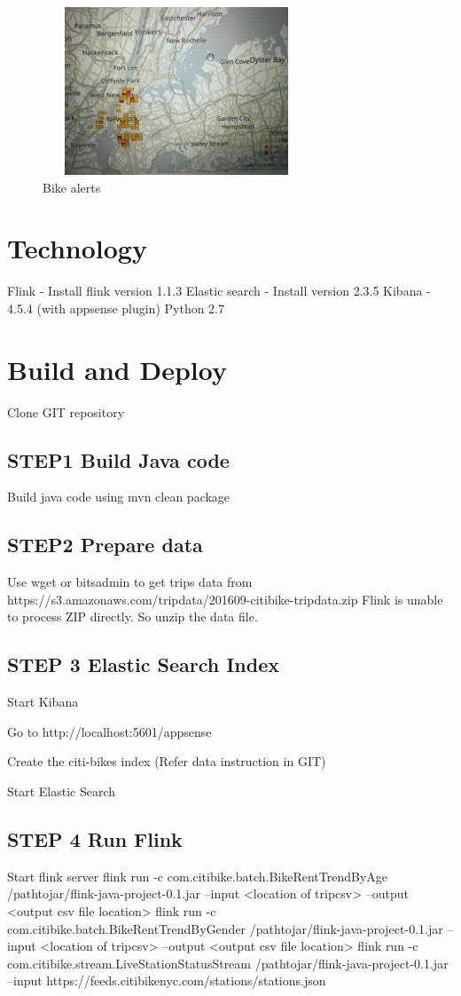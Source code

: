 \documentclass{sig-alternate-05-2015}
\begin{document}
\begin{figure}[!ht]
\includegraphics[width=8cm, height=5cm]{bikealerts}
 \caption{Bike alerts}\label{F:small}
\end{figure}
\section {Technology}
Flink - Install flink version 1.1.3 
\break
Elastic search - Install version 2.3.5
\break
Kibana - 4.5.4 (with appsense plugin)
Python 2.7\break

\section {Build and Deploy}

Clone GIT repository

\subsection {STEP1 Build Java code}
Build java code using \break
mvn clean package

\subsection {STEP2 Prepare data}
Use wget or bitsadmin to get trips data from 
https://s3.amazonaws.com/tripdata/201609-citibike-tripdata.zip
\break
Flink is unable to process ZIP directly. So unzip the data file.


\subsection {STEP 3 Elastic Search Index}
Start Kibana

Go to http://localhost:5601/appsense

Create the citi-bikes index (Refer data instruction in GIT)

Start Elastic Search


\subsection {STEP 4 Run Flink}
Start flink server 
\break
flink run -c com.citibike.batch.BikeRentTrendByAge /pathtojar/flink-java-project-0.1.jar --input <location of tripcsv> --output <output csv file location>
\break
flink run -c com.citibike.batch.BikeRentTrendByGender /pathtojar/flink-java-project-0.1.jar --input <location of tripcsv> --output <output csv file location>
\break
flink run -c com.citibike.stream.LiveStationStatusStream /pathtojar/flink-java-project-0.1.jar --input https://feeds.citibikenyc.com/stations/stations.json
\end{document}
